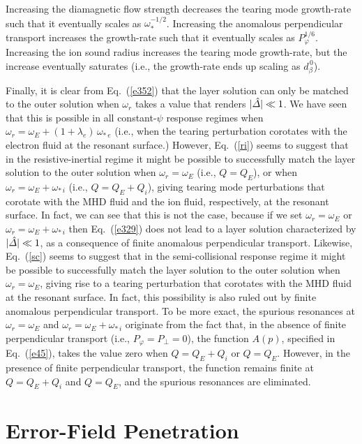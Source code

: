 \documentclass[12pt,prb,aps]{revtex4-1}
\begin{document}
Increasing  the diamagnetic flow strength decreases the tearing mode growth-rate such that it
eventually scales as $\omega_\ast^{-1/2}$. Increasing the anomalous perpendicular transport increases the
growth-rate such that it  eventually scales as $P_\varphi^{1/6}$. Increasing the ion sound radius 
increases the tearing mode growth-rate, but the increase eventually saturates (i.e., the
growth-rate ends up scaling as $d_\beta^{\,0}$). 

Finally, it is clear from Eq.~(\ref{e352}) that the layer solution can only be matched to the
outer solution when $\omega_r$ takes a value that renders $|\hat{\mit\Delta}|\ll 1$. We have seen that this
is possible in all constant-$\psi$ response regimes when $\omega_r= \omega_E+(1+\lambda_e)\,\omega_{\ast\,e}$
(i.e., when the tearing perturbation corotates with the electron fluid at the resonant surface.) However, Eq.~(\ref{ri})
seems to suggest that in the resistive-inertial regime it might be possible to successfully match the
layer solution to the outer solution when $\omega_r=\omega_E$ (i.e., $Q=Q_E$), or when 
$\omega_r=\omega_E+\omega_{\ast\,i}$
(i.e., $Q=Q_E+Q_i$),
giving tearing mode perturbations that corotate with the MHD fluid and the ion fluid, respectively, at the resonant
surface. In fact, we can see that this is not the case, because if we set $\omega_r=\omega_E$ or $\omega_r=\omega_E+\omega_{\ast\,i}$  then Eq.~(\ref{e329}) does not lead to a layer solution characterized by  $|\hat{\mit\Delta}|\ll 1$, 
as a consequence of finite anomalous perpendicular transport.\cite{ber} Likewise, Eq.~(\ref{sc}) seems to suggest that in the semi-collisional response regime it might be possible to successfully match the
layer solution to the outer solution when $\omega_r=\omega_E$, giving rise to a tearing perturbation that corotates with the MHD fluid at the resonant surface.  In fact, this possibility is also ruled out by finite anomalous
perpendicular transport. To be more exact, the spurious resonances at  $\omega_r=\omega_E$ and $\omega_r=\omega_E+\omega_{\ast\,i}$  originate from the fact that, in the absence of finite
perpendicular transport (i.e., $P_\varphi=P_\perp=0$), the function $A(p)$, specified in Eq.~(\ref{e45}), takes the value
zero when $Q=Q_E+Q_i$ or $Q=Q_E$. However, in the presence of finite perpendicular transport, the function
remains finite at  $Q=Q_E+Q_i$ and $Q=Q_E$, and the spurious resonances are eliminated.

\section{Error-Field Penetration}\label{error}
\end{document}
